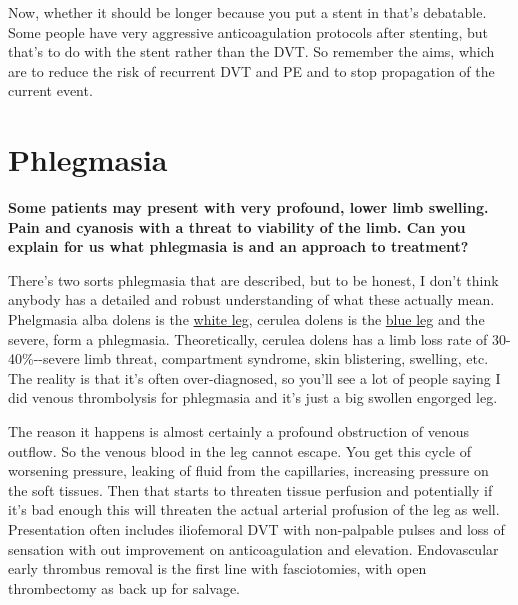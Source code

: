 \documentclass[
]{book}
\begin{document}
Now, whether it should be longer because you put a stent in that's
debatable. Some people have very aggressive anticoagulation protocols
after stenting, but that's to do with the stent rather than the DVT. So
remember the aims, which are to reduce the risk of recurrent DVT and PE
and to stop propagation of the current event.

\hypertarget{phlegmasia}{%
\section{Phlegmasia}\label{phlegmasia}}

\textbf{Some patients may present with very profound, lower limb swelling.
Pain and cyanosis with a threat to viability of the limb. Can you
explain for us what phlegmasia is and an approach to treatment?}

There's two sorts phlegmasia that are described, but to be honest, I
don't think anybody has a detailed and robust understanding of what
these actually mean. Phelgmasia alba dolens is the \href{https://www.google.com/search?q=Phlegmasia+alba+dolens\&client=safari\&rls=en\&sxsrf=ALiCzsY3xqSSjZro2T2oiRHzVPLniGwqAQ:1665422481903\&source=lnms\&tbm=isch\&sa=X\&ved=2ahUKEwj727ybltb6AhXJoWoFHe3xCsMQ_AUoAXoECAEQAw\&biw=1121\&bih=1148\&dpr=1}{white
leg},
cerulea dolens is the \href{https://www.google.com/search?q=Phlegmasia+cerulea+dolens\&tbm=isch\&ved=2ahUKEwjIicmcltb6AhURQUIHHV_iC8gQ2-cCegQIABAA\&oq=Phlegmasia+cerulea+dolens\&gs_lcp=CgNpbWcQAzIICAAQgAQQsQMyBQgAEIAEMgUIABCABDIFCAAQgAQyBQgAEIAEMgUIABCABDIFCAAQgAQyBQgAEIAEMgUIABCABDIFCAAQgAQ6BAgjECc6BAgAEEM6BggAEAUQHjoECAAQHjoGCAAQBxAeUNTtA1jNhgRg_JEEaAFwAHgBgAF0iAHEC5IBBDE2LjGYAQCgAQGqAQtnd3Mtd2l6LWltZ8ABAQ\&sclient=img\&ei=lFREY8jvC5GCieoP38SvwAw\&bih=1148\&biw=1121\&client=safari}{blue
leg}
and the severe, form a phlegmasia. Theoretically, cerulea dolens has a
limb loss rate of 30-40\%-\/-severe limb threat, compartment syndrome,
skin blistering, swelling, etc. The reality is that it's often
over-diagnosed, so you'll see a lot of people saying I did venous
thrombolysis for phlegmasia and it's just a big swollen engorged leg.

The reason it happens is almost certainly a profound obstruction of
venous outflow. So the venous blood in the leg cannot escape. You get
this cycle of worsening pressure, leaking of fluid from the capillaries,
increasing pressure on the soft tissues. Then that starts to threaten
tissue perfusion and potentially if it's bad enough this will threaten
the actual arterial profusion of the leg as well. Presentation often
includes iliofemoral DVT with non-palpable pulses and loss of sensation
with out improvement on anticoagulation and elevation. Endovascular
early thrombus removal is the first line with fasciotomies, with open
thrombectomy as back up for salvage.\citep{erdoes2011, thomas2019}
\end{document}
